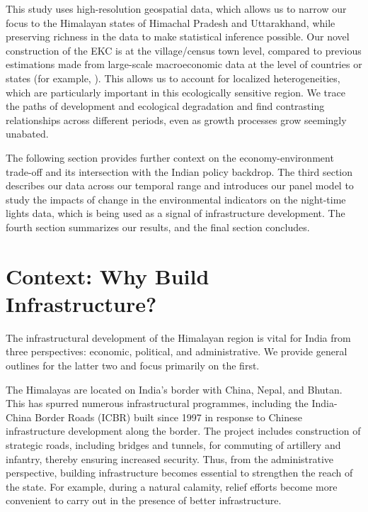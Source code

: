 \documentclass[a4paper,12pt]{article}
\begin{document}
This study uses high-resolution geospatial data, which allows us to narrow our focus to the Himalayan states of Himachal Pradesh and Uttarakhand, while preserving richness in the data to make statistical inference possible. Our novel construction of the EKC is at the village/census town level, compared to previous estimations made from large-scale macroeconomic data at the level of countries or states (for example, \cite{caviglia2009,kalka2013,list1999}). This allows us to account for localized heterogeneities, which are particularly important in this ecologically sensitive region. We trace the paths of development and ecological degradation and find contrasting relationships across different periods, even as growth processes grow seemingly unabated.

The following section provides further context on the economy-environment trade-off and its intersection with the Indian policy backdrop. The third section describes our data across our temporal range and introduces our panel model to study the impacts of change in the environmental indicators on the night-time lights data, which is being used as a signal of infrastructure development. The fourth section summarizes our results, and the final section concludes.


\section{Context: Why Build Infrastructure?}

The infrastructural development of the Himalayan region is vital for India from three perspectives: economic, political, and administrative. We provide general outlines for the latter two and focus primarily on the first.

The Himalayas are located on India’s border with China, Nepal, and Bhutan. This has spurred numerous infrastructural programmes, including the India-China Border Roads (ICBR) built since 1997 \parencite{mha_n.d.} in response to Chinese infrastructure development along the border. The project includes construction of strategic roads, including bridges and tunnels, for commuting of artillery and infantry, thereby ensuring increased security. Thus, from the administrative perspective, building infrastructure becomes essential to strengthen the reach of the state. For example, during a natural calamity, relief efforts become more convenient to carry out in the presence of better infrastructure.
\end{document}
